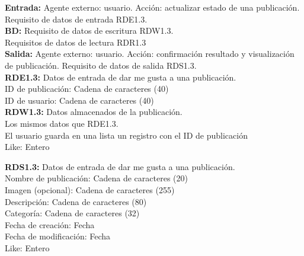 \textbf{\textcolor{rojo}{Entrada:}} Agente externo: usuario. Acción: actualizar estado de una publicación. 
Requisito de datos de entrada \textcolor{azul}{RDE1.3}. \\[6pt]

\textbf{\textcolor{rojo}{BD:}} Requisito de datos de escritura \textcolor{azul}{RDW1.3}.\\ 
\hspace*{1cm}Requisitos de datos de lectura \textcolor{azul}{RDR1.3}\\[6pt]

\textbf{\textcolor{rojo}{Salida:}} Agente externo: usuario. Acción: confirmación resultado y visualización de publicación. 
Requisito de datos de salida \textcolor{azul}{RDS1.3}. \\[12pt]

\textcolor{azul}{\textbf{RDE1.3:}} Datos de entrada de dar me gusta a una publicación. \\
\hspace*{1cm} ID de publicación: Cadena de caracteres (40) \\
\hspace*{1cm} ID de usuario: Cadena de caracteres (40) \\[12pt]

\textcolor{azul}{\textbf{RDW1.3:}} Datos almacenados de la publicación. \\
\hspace*{1cm} Los mismos datos que RDE1.3. \\
\hspace*{1cm} El usuario guarda en una lista un registro con el ID de publicación \\
\hspace*{1cm} Like: Entero \\[12pt]
\pagebreak

\textcolor{azul}{\textbf{RDS1.3:}} Datos de entrada de dar me gusta a una publicación. \\
\hspace*{1cm} Nombre de publicación: Cadena de caracteres (20) \\
\hspace*{1cm} Imagen (opcional): Cadena de caracteres (255) \\
\hspace*{1cm} Descripción: Cadena de caracteres (80) \\ 
\hspace*{1cm} Categoría: Cadena de caracteres (32) \\
\hspace*{1cm} Fecha de creación: Fecha \\
\hspace*{1cm} Fecha de modificación: Fecha \\
\hspace*{1cm} Like: Entero \\ [12pt]

